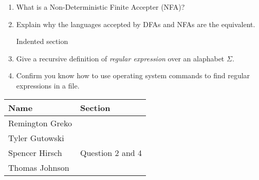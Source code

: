 \documentclass{article}
\begin{document}
\begin{enumerate}
    \medskip

    \item What is a Non-Deterministic Finite Accepter (NFA)?
    
    \medskip


    \medskip

    \item Explain why the languages accepted by DFAs and NFAs are the equivalent.
    
    \medskip

    \-\hspace{0.5cm} Indented section

    \medskip

    \item Give a recursive definition of \textit{regular expression} over
            an alaphabet $\Sigma$.

    \medskip


    \medskip

    \item Confirm you know how to use operating system commands to find
            regular expressions in a file.

    \medskip


    \medskip
\end{enumerate}

\pagebreak

\begin{center}
    \begin{tabular}{|p{3cm}|p{6cm}|}
        \hline
        \textbf{Name} & \textbf{Section} \\
        \hline
        Remington Greko &  \\
        \hline
        Tyler Gutowski &  \\
        \hline
        Spencer Hirsch &  Question 2 and 4\\
        \hline
        Thomas Johnson &  \\
        \hline
    \end{tabular}
\end{center}
\end{document}
